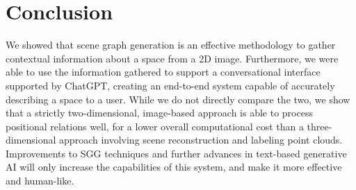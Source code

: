 \documentclass[letterpaper, 10 pt, conference]{ieeeconf}  %
\begin{document}
\section{Conclusion}
    We showed that scene graph generation is an effective methodology to gather contextual information about a space from a 2D image. Furthermore, we were able to use the information gathered to support a conversational interface supported by ChatGPT, creating an end-to-end system capable of accurately describing a space to a user. While we do not directly compare the two, we show that a strictly two-dimensional, image-based approach is able to process positional relations well, for a lower overall computational cost than a three-dimensional approach involving scene reconstruction and labeling point clouds. Improvements to SGG techniques and further advances in text-based generative AI will only increase the capabilities of this system, and make it more effective and human-like. 
    



\end{document}
